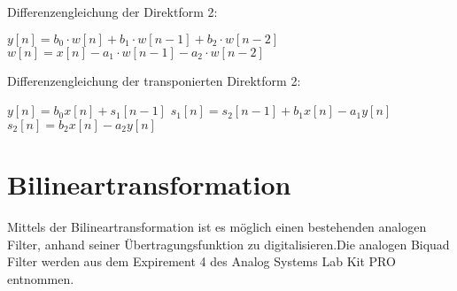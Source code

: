 \documentclass[
  ngerman,
  letterpaper,
  DIV=11]{scrreprt}
\begin{document}
Differenzengleichung der Direktform 2:

\(y[n] = b_0 \cdot w[n] + b_1 \cdot w[n-1] + b_2 \cdot w[n-2]\)
\(w[n] = x[n] - a_1 \cdot w[n-1] - a_2 \cdot w[n-2]\)

Differenzengleichung der transponierten Direktform 2:

\(y[n] = b_0 x[n] + s_1[n-1]\)
\(s_1[n] = s_2[n - 1] + b_1 x[n] - a_1 y[n]\)
\(s_2[n] = b_2 x[n] - a_2 y[n]\)

\chapter{Bilineartransformation}\label{bilineartransformation}

Mittels der Bilineartransformation ist es möglich einen bestehenden
analogen Filter, anhand seiner Übertragungsfunktion zu
digitalisieren.Die analogen Biquad Filter werden aus dem Expirement 4
des Analog Systems Lab Kit PRO entnommen.
\end{document}
